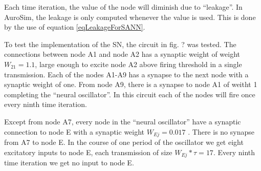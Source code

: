 	Each time iteration, the value of the node will diminish due to ``leakage''. 
	In AuroSim, the leakage is only computed whenever the value is used.
	This is done by the use of equation \eqref{eqLeakageForSANN}.

	To test the implementation of the SN, the circuit in fig. ? %
		was tested. The connections between node A1 and node A2 has a synaptic weight of weight $W_{21}=1.1$, large enough to excite node A2 above firing threshold in a single transmission.
	Each of the nodes A1-A9 has a synapse to the next node with a synaptic weight of one. 
	From node A9, there is a synapse to node A1 of weitht 1 completing the ``neural oscillator''. In this circuit each of the nodes will fire once every ninth time iteration.

	Except from node A7, every node in the ``neural oscillator'' have a synaptic connection to node E with a synaptic weight $W_{Ej}=0.017$ . %
	There is no synapse from A7 to node E.
	In the course of one period of the oscillator we get eight excitatory inputs to node E, each transmission of size $W_{Ej}*\tau = 17$. 
	Every ninth time iteration we get no input to node E.

